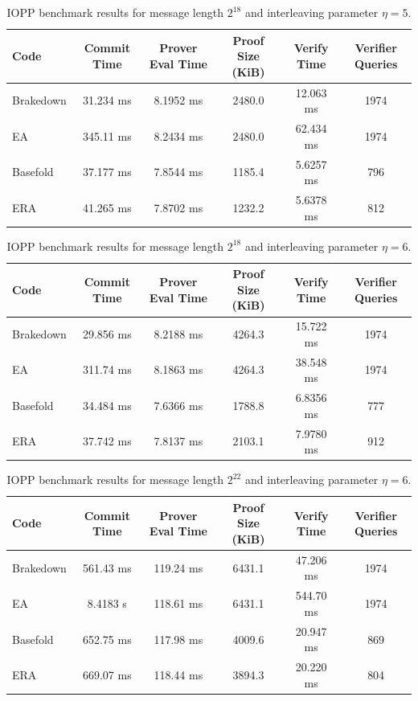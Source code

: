 \begin{table}[htbp]
\centering
\begin{tabular}{lccccc}
\hline
Code & Commit Time & Prover Eval Time & Proof Size (KiB) & Verify Time & Verifier Queries \\
\hline
Brakedown & 31.234 ms & 8.1952 ms & 2480.0 & 12.063 ms & 1974 \\
EA & 345.11 ms & 8.2434 ms & 2480.0 & 62.434 ms & 1974 \\
Basefold & 37.177 ms & 7.8544 ms & 1185.4 & 5.6257 ms & 796 \\
ERA & 41.265 ms & 7.8702 ms & 1232.2 & 5.6378 ms & 812 \\
\hline
\end{tabular}
\caption{IOPP benchmark results for message length $2^{18}$ and interleaving parameter $\eta=5$.}
\label{tab:iopp-218-eta5}
\end{table}

\begin{table}[htbp]
\centering
\begin{tabular}{lccccc}
\hline
Code & Commit Time & Prover Eval Time & Proof Size (KiB) & Verify Time & Verifier Queries \\
\hline
Brakedown & 29.856 ms & 8.2188 ms & 4264.3 & 15.722 ms & 1974 \\
EA & 311.74 ms & 8.1863 ms & 4264.3 & 38.548 ms & 1974 \\
Basefold & 34.484 ms & 7.6366 ms & 1788.8 & 6.8356 ms & 777 \\
ERA & 37.742 ms & 7.8137 ms & 2103.1 & 7.9780 ms & 912 \\
\hline
\end{tabular}
\caption{IOPP benchmark results for message length $2^{18}$ and interleaving parameter $\eta=6$.}
\label{tab:iopp-218-eta6}
\end{table}

\begin{table}[htbp]
\centering
\begin{tabular}{lccccc}
\hline
Code & Commit Time & Prover Eval Time & Proof Size (KiB) & Verify Time & Verifier Queries \\
\hline
Brakedown & 561.43 ms & 119.24 ms & 6431.1 & 47.206 ms & 1974 \\
EA & 8.4183 s & 118.61 ms & 6431.1 & 544.70 ms & 1974 \\
Basefold & 652.75 ms & 117.98 ms & 4009.6 & 20.947 ms & 869 \\
ERA & 669.07 ms & 118.44 ms & 3894.3 & 20.220 ms & 804 \\
\hline
\end{tabular}
\caption{IOPP benchmark results for message length $2^{22}$ and interleaving parameter $\eta=6$.}
\label{tab:iopp-222-eta6}
\end{table}

